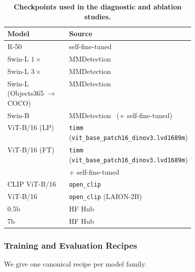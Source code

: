 \begin{table}[h]
\centering
\small
\caption{\textbf{Checkpoints used in the diagnostic and ablation studies.}}
\label{tab:app-ckpts}
\begin{tabularx}{\linewidth}{@{}>{\raggedright\arraybackslash}p{0.44\linewidth}>{\raggedright\arraybackslash}X@{}}
\toprule
Model & Source \\
\midrule
\codino{} R-50                                          & self-fine-tuned \\
\codino{} Swin-L $1\times$~\cite{zong2023detrs}         & MMDetection~\cite{chen2019mmdetection} \\
\codino{} Swin-L $3\times$~\cite{zong2023detrs}         & MMDetection~\cite{chen2019mmdetection} \\
\codino{} Swin-L (Objects365 $\rightarrow$ COCO)~\cite{zong2023detrs}   & MMDetection~\cite{chen2019mmdetection} \\
\gdino{} Swin-B~\cite{liu2024grounding}                 & MMDetection~\cite{chen2019mmdetection} (+ self-fine-tuned) \\
\dinov{} ViT-B/16 (LP)~\cite{simeoni2025dinov3}         & \texttt{timm} (\nolinkurl{vit_base_patch16_dinov3.lvd1689m}) \\
\dinov{} ViT-B/16 (FT)~\cite{simeoni2025dinov3}         & \texttt{timm} (\nolinkurl{vit_base_patch16_dinov3.lvd1689m}) \\ & + self-fine-tuned \\
CLIP ViT-B/16~\cite{radford2021learning}                & \texttt{open\_clip} \\
\openclip{} ViT-B/16~\cite{cherti2023reproducible}      & \texttt{open\_clip} (LAION-2B) \\
\llava{} 0.5b~\cite{li2024llava}                        & HF Hub \\
\llava{} 7b~\cite{li2024llava}                          & HF Hub \\
\bottomrule
\end{tabularx}
\end{table}

\subsubsection{Training and Evaluation Recipes}\label{app:exp-recipes}

We give one canonical recipe per model family. 

